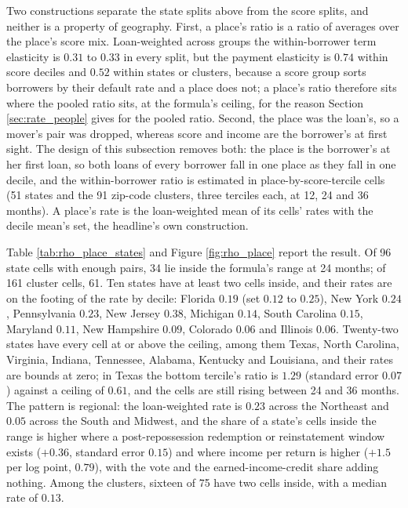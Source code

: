 Two constructions separate the state splits above from the score splits, and neither is a property of geography. First, a place's ratio is a ratio of averages over the place's score mix. Loan-weighted across groups the within-borrower term elasticity is $0.31$ to $0.33$ in every split, but the payment elasticity is $0.74$ within score deciles and $0.52$ within states or clusters, because a score group sorts borrowers by their default rate and a place does not; a place's ratio therefore sits where the pooled ratio sits, at the formula's ceiling, for the reason Section \ref{sec:rate_people} gives for the pooled ratio. Second, the place was the loan's, so a mover's pair was dropped, whereas score and income are the borrower's at first sight. The design of this subsection removes both: the place is the borrower's at her first loan, so both loans of every borrower fall in one place as they fall in one decile, and the within-borrower ratio is estimated in place-by-score-tercile cells (51 states and the 91 zip-code clusters, three terciles each, at 12, 24 and 36 months). A place's rate is the loan-weighted mean of its cells' rates with the decile mean's set, the headline's own construction.

Table \ref{tab:rho_place_states} and Figure \ref{fig:rho_place} report the result. Of 96 state cells with enough pairs, 34 lie inside the formula's range at 24 months; of 161 cluster cells, 61. Ten states have at least two cells inside, and their rates are on the footing of the rate by decile: Florida $0.19$ (set $0.12$ to $0.25$), New York $0.24$, Pennsylvania $0.23$, New Jersey $0.38$, Michigan $0.14$, South Carolina $0.15$, Maryland $0.11$, New Hampshire $0.09$, Colorado $0.06$ and Illinois $0.06$. Twenty-two states have every cell at or above the ceiling, among them Texas, North Carolina, Virginia, Indiana, Tennessee, Alabama, Kentucky and Louisiana, and their rates are bounds at zero; in Texas the bottom tercile's ratio is $1.29$ (standard error $0.07$) against a ceiling of $0.61$, and the cells are still rising between 24 and 36 months. The pattern is regional: the loan-weighted rate is $0.23$ across the Northeast and $0.05$ across the South and Midwest, and the share of a state's cells inside the range is higher where a post-repossession redemption or reinstatement window exists ($+0.36$, standard error $0.15$) and where income per return is higher ($+1.5$ per log point, $0.79$), with the vote and the earned-income-credit share adding nothing. Among the clusters, sixteen of 75 have two cells inside, with a median rate of $0.13$.

